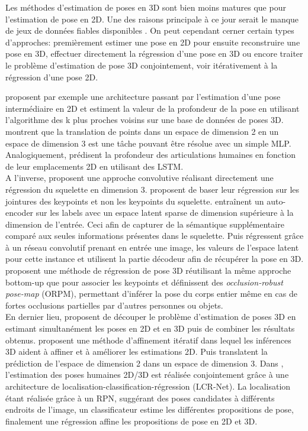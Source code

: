 Les méthodes d'estimation de poses en 3D sont bien moins matures que pour l'estimation de pose en 2D. Une des raisons principale à ce jour serait le manque de jeux de données fiables disponibles \cite{2018arXiv180309722Y}.
On peut cependant cerner certain types d'approches: premièrement estimer une pose en 2D pour ensuite reconstruire une pose en 3D, effectuer directement la régression d'une pose en 3D ou encore traiter le problème d'estimation de pose 3D conjointement, voir itérativement à la régression d'une pose 2D.


\cite{2016arXiv161206524C} proposent par exemple une architecture passant par l'estimation d'une pose intermédiaire en 2D et estiment la valeur de la profondeur de la pose en utilisant l'algorithme des k plus proches voisins sur une base de données de poses 3D.
\cite{martinez2017simple} montrent que la translation de points dans un espace de dimension 2 en un espace de dimension 3 est une tâche pouvant être résolue avec un simple MLP.
Analogiquement, \cite{nie2017monocular} prédisent la profondeur des articulations humaines en fonction de leur emplacements 2D en utilisant des LSTM.\\

A l'inverse, \cite{li20143d} proposent une approche convolutive réalisant directement une régression du squelette en dimension 3. \cite{sun2017compositional} proposent de baser leur régression sur les jointures des keypoints et non les keypoints du squelette.
\cite{tekin2016structured} entraînent un auto-encoder sur les labels avec un espace latent sparse de dimension supérieure à la dimension de l'entrée. Ceci afin de capturer de la sémantique supplémentaire comparé aux seules informations présentes dans le squelette. Puis régressent grâce à un réseau convolutif prenant en entrée une image, les valeurs de l'espace latent pour cette instance et utilisent la partie décodeur afin de récupérer la pose en 3D.\cite{singleshotmultiperson2018} proposent une  méthode de régression de pose 3D réutilisant la même approche bottom-up que \cite{cao2017realtime} pour associer les keypoints et définissent des \textit{occlusion-robust pose-map} (ORPM), permettant d'inférer la pose du corps entier même en cas de fortes occlusions partielles par d'autres personnes ou objets.\\

En dernier lieu, \cite{simo2013joint} proposent de découper le problème d'estimation de poses 3D en estimant simultanément les poses en 2D et en 3D puis de combiner les résultats obtenus. \cite{tome2017lifting} proposent une méthode d'affinement itératif dans lequel les inférences 3D aident à affiner et à améliorer les estimations 2D. Puis translatent la prédiction de l'espace de dimension 2 dans un espace de dimension 3. Dans \cite{rogez2019lcr}, l'estimation des poses humaines 2D/3D est réalisée conjointement grâce à une architecture de localisation-classification-régression (LCR-Net). La localisation étant réalisée grâce à un RPN, suggérant des poses candidates à différents endroits de l'image, un classificateur estime les différentes propositions de pose, finalement une régression affine les propositions de pose en 2D et 3D.

